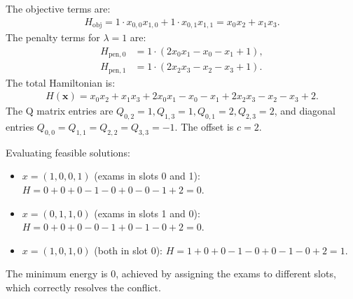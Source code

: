 \documentclass[12pt]{article}
\begin{document}
The objective terms are:
\begin{align}
    H_{\text{obj}} = 1 \cdot x_{0,0} x_{1,0} + 1 \cdot x_{0,1} x_{1,1} = x_0 x_2 + x_1 x_3.
\end{align}
The penalty terms for $\lambda = 1$ are:
\begin{align}
    H_{\text{pen}, 0} &= 1 \cdot (2 x_0 x_1 - x_0 - x_1 + 1), \\
    H_{\text{pen}, 1} &= 1 \cdot (2 x_2 x_3 - x_2 - x_3 + 1).
\end{align}
The total Hamiltonian is:
\begin{align}
    H(\mathbf{x}) = x_0 x_2 + x_1 x_3 + 2 x_0 x_1 - x_0 - x_1 + 2 x_2 x_3 - x_2 - x_3 + 2.
\end{align}
The Q matrix entries are $Q_{0,2}=1, Q_{1,3}=1, Q_{0,1}=2, Q_{2,3}=2$, and diagonal entries $Q_{0,0}=Q_{1,1}=Q_{2,2}=Q_{3,3}=-1$. The offset is $c=2$.

Evaluating feasible solutions:
\begin{itemize}
    \item $x = (1,0,0,1)$ (exams in slots 0 and 1): $H = 0 + 0 + 0 - 1 - 0 + 0 - 0 - 1 + 2 = 0$.
    \item $x = (0,1,1,0)$ (exams in slots 1 and 0): $H = 0 + 0 + 0 - 0 - 1 + 0 - 1 - 0 + 2 = 0$.
    \item $x = (1,0,1,0)$ (both in slot 0): $H = 1 + 0 + 0 - 1 - 0 + 0 - 1 - 0 + 2 = 1$.
\end{itemize}
The minimum energy is $0$, achieved by assigning the exams to different slots, which correctly resolves the conflict.
\end{document}
